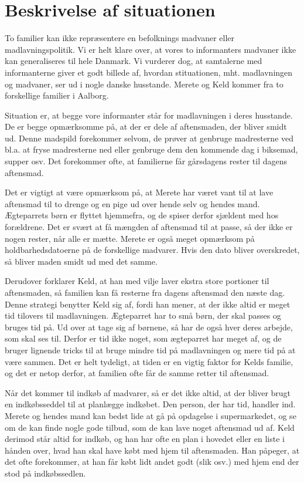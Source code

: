 \section{Beskrivelse af situationen}
\label{sec:situation}

To familier kan ikke repræsentere en befolknings madvaner eller madlavningspolitik. Vi er helt klare over, at vores to informanters madvaner ikke kan generaliseres til hele Danmark. Vi vurderer dog, at samtalerne med informanterne giver et godt billede af, hvordan stituationen, mht. madlavningen og madvaner, ser ud i nogle danske husstande. Merete og Keld kommer fra to forskellige familier i Aalborg.

Situation er, at begge vore informanter står for madlavningen i deres husstande. De er begge opmærksomme på, at der er dele af aftensmaden, der bliver smidt ud. Denne madspild forekommer selvom, de prøver at genbruge madresterne ved bl.a. at fryse madresterne ned eller genbruge dem den kommende dag i \fx biksemad, supper osv. Det forekommer ofte, at familierne får gårsdagens rester til dagens aftensmad.

Det er vigtigt at være opmærksom på, at Merete har været vant til at lave aftensmad til to drenge og en pige ud over hende selv og hendes mand. Ægteparrets børn er flyttet hjemmefra, og de spiser derfor sjældent med hos forældrene. Det er svært at få mængden af aftensmad til at passe, så der ikke er nogen rester, når alle er mætte. Merete er også meget opmærksom på holdbarhedsdatoerne på de forskellige madvarer. Hvis den dato bliver overskredet, så bliver maden smidt ud med det samme.

Derudover forklarer Keld, at han med vilje laver ekstra store portioner til aftensmaden, så familien kan få resterne fra dagens aftensmad den næste dag. Denne strategi benytter Keld sig af, fordi han mener, at der ikke altid er meget tid tilovers til madlavningen. Ægteparret har to små børn, der skal passes og bruges tid på. Ud over at tage sig af børnene, så har de også hver deres arbejde, som skal ses til. Derfor er tid ikke noget, som ægteparret har meget af, og de bruger lignende tricks til at bruge mindre tid på madlavningen og mere tid på at være sammen. Det er helt tydeligt, at tiden er en vigtig faktor for Kelds familie, og det er netop derfor, at familien ofte får de samme retter til aftensmad.

Når det kommer til indkøb af madvarer, så er det ikke altid, at der bliver brugt en indkøbsseddel til at planlægge indkøbet. Den person, der har tid, handler ind. Merete og hendes mand kan bedst lide at gå på opdagelse i supermarkedet, og se om de kan finde nogle gode tilbud, som de kan lave noget aftensmad ud af. Keld derimod står altid for indkøb, og han har ofte en plan i hovedet eller en liste i hånden over, hvad han skal have købt med hjem til aftensmaden. Han påpeger, at det ofte forekommer, at han får købt lidt andet godt (slik osv.) med hjem end der stod på indkøbssedlen.

